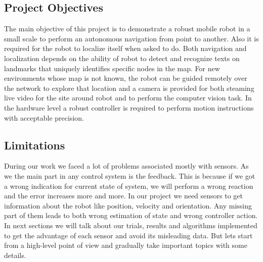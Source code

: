 \documentclass[12pt]{article}
\begin{document}
\subsection{Project Objectives}
The main objective of this project is to demonstrate a robust mobile robot in a small scale to perform an autonomous navigation from point to another. Also it is required for the robot to localize itself when asked to do. Both navigation and localization depends on the ability of robot to detect and recognize texts on landmarks that uniquely identifies specific nodes in the map.
For new environments whose map is not known, the robot can be guided remotely over the network to explore that location and a camera is provided for both steaming live video for the site around robot and to perform the computer vision task.
In the hardware level a robust controller is required to perform motion instructions with acceptable precision.

\newpage

\subsection{Limitations}
During our work we faced a lot of problems associated mostly with sensors. As we the main part in any control system is the feedback. This is because if we got a wrong indication for current state of system, we will perform a wrong reaction and the error increases more and more. In our project we need sensors to get information about the robot like position, velocity and orientation. Any missing part of them leads to both wrong estimation of state and wrong controller action.
In next sections we will talk about our trials, results and algorithms implemented to get the advantage of each sensor and avoid its misleading data.
\noindent But lets start from a high-level point of view and gradually take important topics with some details.
\end{document}

